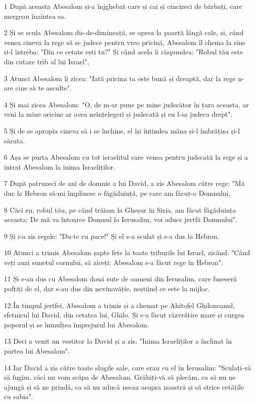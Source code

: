 \par 1 După aceasta Abesalom și-a înjghebat care și cai și cincizeci de bărbați, care mergeau înaintea sa.
\par 2 Și se scula Abesalom dis-de-dimineață, se oprea la poartă lângă cale, și, când venea cineva la rege să se judece pentru vreo pricină, Abesalom îl chema la sine și-l întreba: "Din ce cetate ești tu?" Și când acela îi răspundea: "Robul tău este din cutare trib al lui Israel",
\par 3 Atunci Abesalom îi zicea: "Iată pricina ta este bună și dreaptă, dar la rege n-are cine să te asculte".
\par 4 Și mai zicea Abesalom: "O, de m-ar pune pe mine judecător în țara aceasta, ar veni la mine oricine ar avea neînțelegeri și judecată și eu l-aș judeca drept".
\par 5 Și de se apropia cineva să i se închine, el își întindea mâna și-l îmbrățișa și-l săruta.
\par 6 Așa se purta Abesalom cu tot israelitul care venea pentru judecată la rege și a intrat Abesalom la inima Israeliților.
\par 7 După patruzeci de ani de domnie a lui David, a zis Abesalom către rege: "Mă duc la Hebron să-mi împlinesc o făgăduință, pe care am făcut-o Domnului,
\par 8 Căci eu, robul tău, pe când trăiam la Gheșur în Siria, am făcut făgăduința aceasta: De mă va întoarce Domnul la Ierusalim, voi aduce jertfă Domnului".
\par 9 Și i-a zis regele: "Du-te cu pace!" Și el s-a sculat și s-a dus la Hebron.
\par 10 Atunci a trimis Abesalom șapte fete la toate triburile lui Israel, zicând: "Când veți auzi sunetul cornului, să ziceți: Abesalom s-a făcut rege în Hebron".
\par 11 Și s-au dus cu Abesalom două sute de oameni din Ierusalim, care fuseseră poftiți de el, dar s-au dus din nevinovăție, neștiind ce este la mijloc.
\par 12 În timpul jertfei, Abesalom a trimis și a chemat pe Ahitofel Ghiloneanul, sfetnicul lui David, din cetatea lui, Ghilo. Și s-a făcut răzvrătire mare și curgea poporul și se înmulțea împrejurul lui Abesalom.
\par 13 Deci a venit un vestitor la David și a zis: "Inima Israeliților a înclinat în partea lui Abesalom".
\par 14 Iar David a zis către toate slugile sale, care erau cu el în Ierusalim: "Sculați-vă să fugim, căci nu vom scăpa de Abesalom. Grăbiți-vă să plecăm, ca să nu ne ajungă și să ne prindă, ca să nu aducă necaz asupra noastră și să strice cetățile cu sabia".
